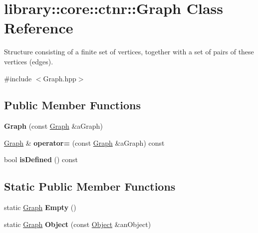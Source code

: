 \hypertarget{classlibrary_1_1core_1_1ctnr_1_1_graph}{}\section{library\+:\+:core\+:\+:ctnr\+:\+:Graph Class Reference}
\label{classlibrary_1_1core_1_1ctnr_1_1_graph}


Structure consisting of a finite set of vertices, together with a set of pairs of these vertices (edges).  




{\ttfamily \#include $<$Graph.\+hpp$>$}

\subsection*{Public Member Functions}
\begin{DoxyCompactItemize}
\item 
\mbox{\label{classlibrary_1_1core_1_1ctnr_1_1_graph_aed97aab348693c80c4cd7b4a3cf3c1ba}} 
{\bfseries Graph} (const \hyperlink{classlibrary_1_1core_1_1ctnr_1_1_graph}{Graph} \&a\+Graph)
\item 
\mbox{\label{classlibrary_1_1core_1_1ctnr_1_1_graph_ac31e1114997d3c6ab11df23e2bfede04}} 
\hyperlink{classlibrary_1_1core_1_1ctnr_1_1_graph}{Graph} \& {\bfseries operator=} (const \hyperlink{classlibrary_1_1core_1_1ctnr_1_1_graph}{Graph} \&a\+Graph) const
\item 
\mbox{\label{classlibrary_1_1core_1_1ctnr_1_1_graph_a089dddc20bedaa9c590fca0c6e6b4677}} 
bool {\bfseries is\+Defined} () const
\end{DoxyCompactItemize}
\subsection*{Static Public Member Functions}
\begin{DoxyCompactItemize}
\item 
\mbox{\label{classlibrary_1_1core_1_1ctnr_1_1_graph_a36b399824e8668d7c068f0933da39731}} 
static \hyperlink{classlibrary_1_1core_1_1ctnr_1_1_graph}{Graph} {\bfseries Empty} ()
\item 
\mbox{\label{classlibrary_1_1core_1_1ctnr_1_1_graph_a3404e53c5dffbafad666f346d3663f0d}} 
static \hyperlink{classlibrary_1_1core_1_1ctnr_1_1_graph}{Graph} {\bfseries Object} (const \hyperlink{classlibrary_1_1core_1_1ctnr_1_1_object}{Object} \&an\+Object)
\end{DoxyCompactItemize}
